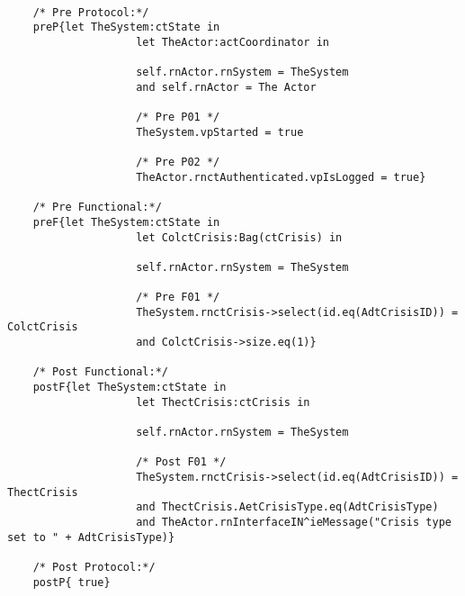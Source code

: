 	\scriptsize
	\vspace{0.5cm}
	\begin{lstlisting}[style=MessirStyle,firstnumber=auto,captionpos=b,caption={\msrmessir (MCL-oriented) specification of the operation \emph{oeSetCrisisType}.},label=OM-actCoordinator-oeSetCrisisType-MCL-LST]

	/* Pre Protocol:*/ 
	preP{let TheSystem:ctState in
					let TheActor:actCoordinator in
					
					self.rnActor.rnSystem = TheSystem
					and self.rnActor = The Actor
					
					/* Pre P01 */
					TheSystem.vpStarted = true
					
					/* Pre P02 */
					TheActor.rnctAuthenticated.vpIsLogged = true}
	
	/* Pre Functional:*/
	preF{let TheSystem:ctState in
					let ColctCrisis:Bag(ctCrisis) in
				
					self.rnActor.rnSystem = TheSystem
				
					/* Pre F01 */
					TheSystem.rnctCrisis->select(id.eq(AdtCrisisID)) = ColctCrisis
					and ColctCrisis->size.eq(1)}
	
	/* Post Functional:*/ 
	postF{let TheSystem:ctState in
					let ThectCrisis:ctCrisis in
				
					self.rnActor.rnSystem = TheSystem
				
					/* Post F01 */
					TheSystem.rnctCrisis->select(id.eq(AdtCrisisID)) = ThectCrisis
					and ThectCrisis.AetCrisisType.eq(AdtCrisisType)
					and TheActor.rnInterfaceIN^ieMessage("Crisis type set to " + AdtCrisisType)}
	
	/* Post Protocol:*/ 
	postP{ true}
	
	\end{lstlisting}
	\normalsize 
	
	
	
	





